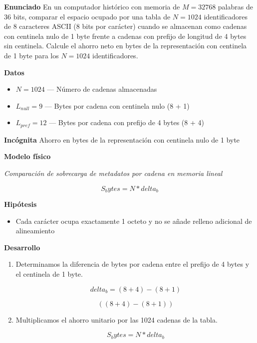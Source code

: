 \documentclass{book}
\begin{document}
\begin{tcolorbox}[title={Problema resuelto}, studiumworked, breakable]

\noindent\textbf{Enunciado}
En un computador histórico con memoria de \(M = 32768\) palabras de 36 bits, comparar el espacio ocupado por una tabla de \(N = 1024\) identificadores de 8 caracteres ASCII (8 bits por carácter) cuando se almacenan como cadenas con centinela nulo de 1 byte frente a cadenas con prefijo de longitud de 4 bytes sin centinela. Calcule el ahorro neto en bytes de la representación con centinela de 1 byte para los \(N = 1024\) identificadores.

\noindent\textbf{Datos}
\begin{itemize}
\item $N = 1024$ — Número de cadenas almacenadas
\item $L_{null} = 9$ — Bytes por cadena con centinela nulo (8 + 1)
\item $L_{pref} = 12$ — Bytes por cadena con prefijo de 4 bytes (8 + 4)
\end{itemize}

\noindent\textbf{Incógnita}
Ahorro en bytes de la representación con centinela nulo de 1 byte

\noindent\textbf{Modelo físico}

\noindent\textit{Comparación de sobrecarga de metadatos por cadena en memoria lineal}

\[
S_bytes = N * delta_b
\]

\noindent\textbf{Hipótesis}
\begin{itemize}
\item Cada carácter ocupa exactamente 1 octeto y no se añade relleno adicional de alineamiento
\end{itemize}

\noindent\textbf{Desarrollo}
\begin{enumerate}
\item
Determinamos la diferencia de bytes por cadena entre el prefijo de 4 bytes y el centinela de 1 byte.

\[
delta_b = (8 + 4) - (8 + 1)
\]

\[
\left(\left(8+4\right)-\left(8+1\right)\right)
\]
\item
Multiplicamos el ahorro unitario por las 1024 cadenas de la tabla.

\[
S_bytes = N * delta_b
\]


\end{enumerate}
\end{tcolorbox}
\end{document}
